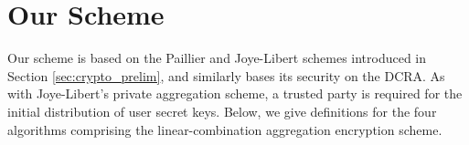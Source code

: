 \documentclass[twocolumn]{autart}
\theoremstyle{definition}
\theoremstyle{remark}
\begin{document}
% 
%                                                                                                
%                                                                                                
%                                                                                                
% 

\section{Our Scheme} \label{sec:our_scheme}
Our scheme is based on the Paillier and Joye-Libert schemes introduced in Section \ref{sec:crypto_prelim}, and similarly bases its security on the DCRA. As with Joye-Libert's private aggregation scheme, a trusted party is required for the initial distribution of user secret keys. Below, we give definitions for the four algorithms comprising the linear-combination aggregation encryption scheme.
\end{document}
